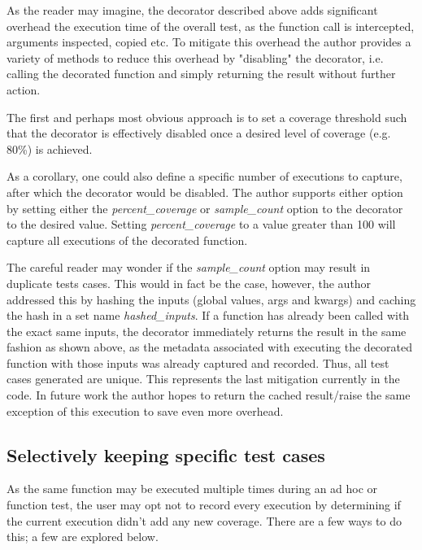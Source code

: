 As the reader may imagine, the decorator described above adds significant overhead 
the execution time of the overall test, as the function call is intercepted,
arguments inspected, copied etc.  To mitigate this overhead the author provides 
a variety of methods to 
reduce this overhead by "disabling" the decorator, i.e. calling the decorated 
function and simply returning the result without further action.

The first and perhaps most obvious approach is to set a coverage threshold such 
that the decorator is effectively disabled once a desired level of coverage 
(e.g. 80\%) is achieved. 

As a corollary, one could also define a specific number 
of executions to capture, after which the decorator would be disabled. 
The author supports either option by setting either the \textit{percent\_coverage} or 
\textit{sample\_count} option to the decorator to the desired value.  Setting 
\textit{percent\_coverage} to a value greater than 100 will capture all 
executions of the decorated function.


The careful reader may wonder if the \textit{sample\_count} option may result in 
duplicate tests cases.  This would in fact be the case, however, the author 
addressed this by hashing the inputs (global values, args and kwargs) and 
caching the hash in a set name \textit{hashed\_inputs}.  If a function has
already been called with the exact same inputs, the decorator immediately returns
the result in the same fashion as shown above, as the metadata associated with executing the decorated function
with those inputs was already captured and recorded.  Thus, all test cases 
generated are unique.  This represents the last mitigation
currently in the code.  In future work the author hopes to return the cached 
result/raise the same exception of this execution to save even more overhead.  

\subsection{Selectively keeping specific test cases}\label{sec:tuning-1}
As the same function may be executed multiple times during an ad hoc or 
function test, the user may opt not to record every execution by determining
 if the current execution didn’t add any new coverage. There are a few 
 ways to do this; a few are explored below.
 
